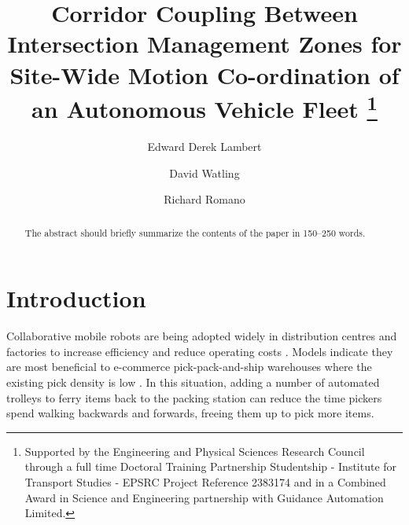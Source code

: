 \documentclass[runningheads]{llncs}
\begin{document}
%
\title{Corridor Coupling Between Intersection Management Zones for Site-Wide Motion Co-ordination of an Autonomous Vehicle Fleet   
\thanks{Supported by the Engineering and Physical Sciences Research Council through a full time Doctoral Training Partnership Studentship - Institute for Transport Studies - EPSRC Project Reference 2383174 and in a Combined Award in Science and Engineering partnership with Guidance Automation Limited. 
 }}
%
%
\author{Edward Derek Lambert \and
David Watling   \and
Richard Romano}
%
%
%
\maketitle              %
%
\begin{abstract}
The abstract should briefly summarize the contents of the paper in
150--250 words.

\end{abstract}
%
%
%
%
%
\section{Introduction}

Collaborative mobile robots are being adopted widely in distribution centres and factories to increase efficiency and reduce operating costs \cite{Azadeh2019}. Models indicate they are most beneficial to e-commerce pick-pack-and-ship warehouses where the existing pick density is low \cite{Meller2018}. In this situation, adding a number of automated trolleys to ferry items back to the packing station can reduce the time pickers spend walking backwards and forwards, freeing them up to pick more items.
\end{document}
